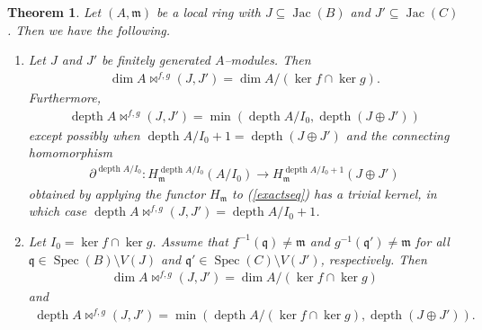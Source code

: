 \documentclass{amsart}%
\newtheorem{theorem}{Theorem}[section]
\theoremstyle{plain}
\numberwithin{equation}{section}
\theoremstyle{definition}
\DeclareMathOperator{\jac}{Jac}
\DeclareMathOperator{\spec}{Spec}
\DeclareMathOperator{\depth}{depth}
\begin{document}
\begin{theorem}\label{dimdepthcalclemma}
    Let $(A,\mathfrak{m})$ be a local ring with $J\subseteq \jac(B)$ and $J'\subseteq \jac(C)$. Then we have the following.
    \begin{enumerate}
        \item Let $J$ and $J'$ be finitely generated $A$--modules. Then 
        \begin{align*}
            \dim A\bowtie^{f,g}(J,J')=\dim A/(\ker f\cap \ker g).
        \end{align*}
        Furthermore,
        \begin{align*}
            \depth A\bowtie^{f,g}(J,J')=\min(\depth A/I_0,\depth (J\oplus J'))
        \end{align*}
        except possibly when $\depth A/I_0+1=\depth (J\oplus J')$ and the connecting homomorphism 
    \begin{align*}
        \partial^{\depth A/I_0}:H_{\mathfrak{m}}^{\depth A/I_0}(A/I_0)\to H_{\mathfrak{m}}^{\depth A/I_0+1}(J\oplus J')
    \end{align*}
    obtained by applying the functor $H_{\mathfrak{m}}$ to (\ref{exactseq}) has a trivial kernel, in which case $\depth A\bowtie^{f,g}(J,J')=\depth A/I_0+1$.
        \item Let $I_0= \ker f\cap\ker g$. Assume that $f^{-1}(\mathfrak{q}) \neq \mathfrak{m}$ and $g^{-1}(\mathfrak{q}') \neq \mathfrak{m}$ for all $\mathfrak{q}\in \spec (B)\setminus V(J)$ and $\mathfrak{q}'\in\spec (C)\setminus V(J')$, respectively. Then 
        \begin{align*}
            \dim A\bowtie^{f,g}(J,J')= \dim A/(\ker f\cap \ker g)
        \end{align*}
        and
        \begin{align*}
            \depth A\bowtie^{f,g}(J,J')=\min( \depth A/(\ker f\cap \ker g),\depth (J\oplus J')).
        \end{align*}
    \end{enumerate}
\end{theorem}
\end{document}
